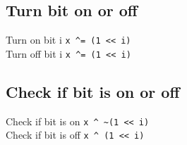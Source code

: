 \subsection{Turn bit on or off}
Turn on bit i \lstinline{x ^= (1 << i)}\\
Turn off bit i \lstinline{x ^= (1 << i)}\\
\subsection{Check if bit is on or off}
Check if bit is on \lstinline{x ^ ~(1 << i)}\\
Check if bit is off \lstinline{x ^ (1 << i)}\\